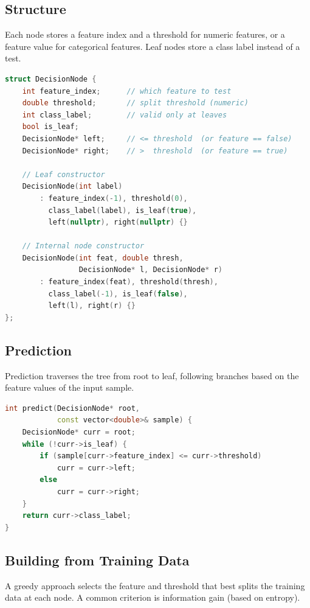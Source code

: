\subsection{Structure}

Each node stores a feature index and a threshold for numeric features,
or a feature value for categorical features.  Leaf nodes store a class
label instead of a test.

\begin{lstlisting}[language=C++]
struct DecisionNode {
    int feature_index;      // which feature to test
    double threshold;       // split threshold (numeric)
    int class_label;        // valid only at leaves
    bool is_leaf;
    DecisionNode* left;     // <= threshold  (or feature == false)
    DecisionNode* right;    // >  threshold  (or feature == true)

    // Leaf constructor
    DecisionNode(int label)
        : feature_index(-1), threshold(0),
          class_label(label), is_leaf(true),
          left(nullptr), right(nullptr) {}

    // Internal node constructor
    DecisionNode(int feat, double thresh,
                 DecisionNode* l, DecisionNode* r)
        : feature_index(feat), threshold(thresh),
          class_label(-1), is_leaf(false),
          left(l), right(r) {}
};
\end{lstlisting}

\subsection{Prediction}

Prediction traverses the tree from root to leaf, following branches
based on the feature values of the input sample.

\begin{lstlisting}[language=C++]
int predict(DecisionNode* root,
            const vector<double>& sample) {
    DecisionNode* curr = root;
    while (!curr->is_leaf) {
        if (sample[curr->feature_index] <= curr->threshold)
            curr = curr->left;
        else
            curr = curr->right;
    }
    return curr->class_label;
}
\end{lstlisting}

\subsection{Building from Training Data}

A greedy approach selects the feature and threshold that best splits
the training data at each node.  A common criterion is information
gain (based on entropy).

